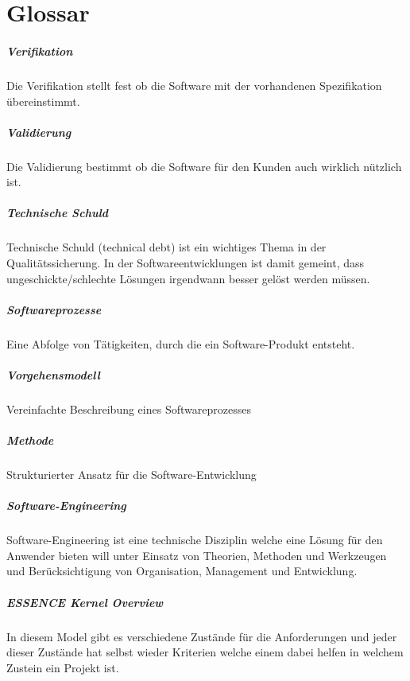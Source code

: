\chapter{Glossar}

\paragraph{Verifikation}
Die Verifikation stellt fest ob die Software mit der vorhandenen Spezifikation übereinstimmt.
\paragraph{Validierung}
Die Validierung bestimmt ob die Software für den Kunden auch wirklich nützlich ist.
\paragraph{Technische Schuld}
Technische Schuld (technical debt) ist ein wichtiges Thema in der Qualitätssicherung. In der Softwareentwicklungen ist damit gemeint, dass ungeschickte/schlechte Lösungen irgendwann besser gelöst werden müssen.
\paragraph{Softwareprozesse}
Eine Abfolge von Tätigkeiten, durch die ein Software-Produkt entsteht.
\paragraph{Vorgehensmodell}
Vereinfachte Beschreibung eines Softwareprozesses
\paragraph{Methode}
Strukturierter Ansatz für die Software-Entwicklung
\paragraph{Software-Engineering}
Software-Engineering ist eine technische Disziplin welche eine Lösung für den Anwender bieten will unter Einsatz von Theorien, Methoden und Werkzeugen und Berücksichtigung von Organisation, Management und Entwicklung. 
\paragraph{ESSENCE Kernel Overview}
In diesem Model gibt es verschiedene Zustände für die Anforderungen und jeder dieser Zustände hat selbst wieder Kriterien welche einem dabei helfen in welchem Zustein ein Projekt ist.
